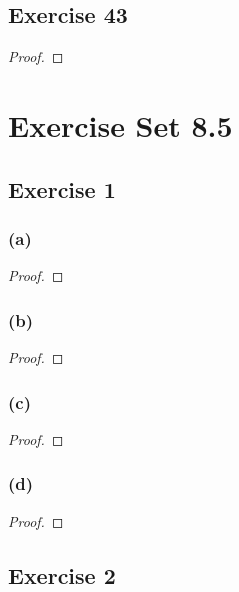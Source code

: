 \documentclass[14pt]{extarticle}
\begin{document}
\subsection{Exercise 43}

\begin{proof}

\end{proof}

\section{Exercise Set 8.5}

\subsection{Exercise 1}

\subsubsection{(a)}

\begin{proof}

\end{proof}

\subsubsection{(b)}

\begin{proof}

\end{proof}

\subsubsection{(c)}

\begin{proof}

\end{proof}

\subsubsection{(d)}

\begin{proof}

\end{proof}

\subsection{Exercise 2}
\end{document}
